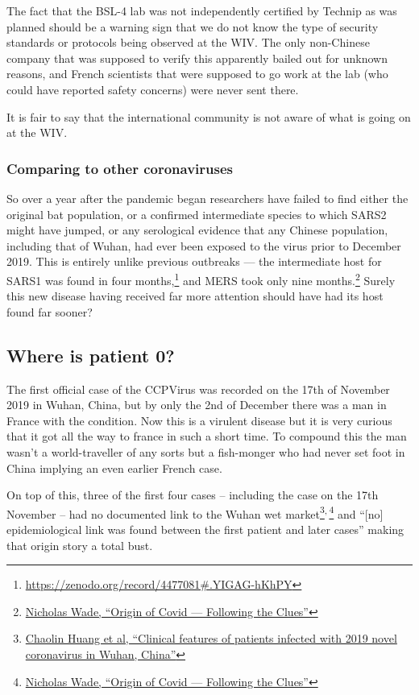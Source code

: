 \documentclass[11pt]{article}
\begin{document}
The fact that the BSL-4 lab was not independently certified by Technip as was planned should be a warning sign that we do not know the type of security standards or protocols being observed at the WIV. The only non-Chinese company that was supposed to verify this apparently bailed out for unknown reasons, and French scientists that were supposed to go work at the lab (who could have reported safety concerns) were never sent there.

It is fair to say that the international community is not aware of what is going on at the WIV.
\subsubsection{Comparing to other coronaviruses}
\label{sec:orgf6f517b}
So over a year after the pandemic began researchers have failed to find either the original bat population, or a confirmed intermediate species to which SARS2 might have jumped, or any serological evidence that any Chinese population, including that of Wuhan, had ever been exposed to the virus prior to December 2019. This is entirely unlike previous outbreaks --- the intermediate host for SARS1 was found in four months,\footnote{\url{https://zenodo.org/record/4477081\#.YIGAG-hKhPY}} and MERS took only nine months.\footnote{\href{https://nicholaswade.medium.com/origin-of-covid-following-the-clues-6f03564c038}{Nicholas Wade, ``Origin of Covid --- Following the Clues''}} Surely this new disease having received far more attention should have had its host found far sooner?
\subsection{Where is patient 0?}
\label{sec:org5984ef1}
The first official case of the CCPVirus was recorded on the 17th of November 2019 in Wuhan, China, but by only the 2nd of December there was a man in France with the condition. Now this is a virulent disease but it is very curious that it got all the way to france in such a short time. To compound this the man wasn't a world-traveller of any sorts but a fish-monger who had never set foot in China implying an even earlier French case.

On top of this, three of the first four cases -- including the case on the 17th November -- had no documented link to the Wuhan wet market\footnote{\href{https://www.thelancet.com/pdfs/journals/lancet/PIIS0140-6736(20)30183-5.pdf}{Chaolin Huang et al, ``Clinical features of patients infected with 2019 novel coronavirus in Wuhan, China''}}\textsuperscript{,}\,\footnote{\href{https://nicholaswade.medium.com/origin-of-covid-following-the-clues-6f03564c038}{Nicholas Wade, ``Origin of Covid --- Following the Clues''}} and ``[no] epidemiological link was found between the first patient and later cases'' making that origin story a total bust.
\end{document}
